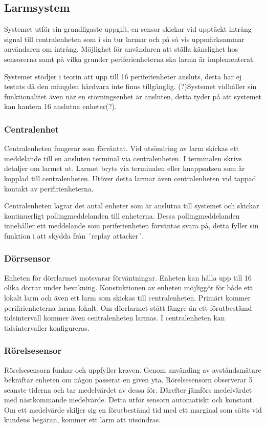 \documentclass[a4paper]{article}
\begin{document}
\subsection{Larmsystem}
Systemet utför sin grundligaste uppgift, en sensor skickar vid upptäckt intrång signal till centralenheten som i sin tur larmar och på så vis uppmärksammar användaren om intrång. Möjlighet för användaren att ställa känslighet hos sensorerna samt på vilka grunder periferienheterna ska larma är implementerat.

Systemet stödjer i teorin att upp till 16 periferienheter ansluts, detta har ej testats då den mängden hårdvara inte finns tillgänglig. (?)Systemet vidhåller sin funktionalitet även när en störningsenhet är ansluten, detta tyder på att systemet kan hantera 16 anslutna enheter(?).

\subsubsection{Centralenhet}
Centralenheten fungerar som förväntat. Vid utsöndring av larm skickas ett meddelande till en ansluten terminal via centralenheten. I terminalen skrivs detaljer om larmet ut. Larmet bryts via terminalen eller knappsatsen som är kopplad till centralenheten. Utöver detta larmar även centralenheten vid tappad kontakt av perifirienheterna.

Centralenheten lagrar det antal enheter som är anslutna till systemet och skickar kontinuerligt pollingmeddelanden till enheterna. Dessa pollingmeddelanden innehåller ett meddelande som periferienheten förväntas svara på, detta fyller sin funktion i att skydda från ´replay attacker´.

\subsubsection{Dörrsensor}
Enheten för dörrlarmet motsvarar förväntningar. Enheten kan hålla upp till 16 olika dörrar under bevakning. Konstuktionen av enheten möjliggör för både ett lokalt larm och även ett larm som skickas till centralenheten. Primärt kommer perifirienheterna larma lokalt. Om dörrlarmet stått längre än ett förutbestämd tidsintervall kommer även centralenheten larmas. I centralenheten kan tidsintervaller konfigureras.

\subsubsection{Rörelsesensor}
Rörelsesensorn funkar och uppfyller kraven. Genom använding av avståndsmätare bekräftar enheten om någon passerat en given yta. Rörelsesensorn observerar 5 seanste tiderna och tar medelvärdet av dessa för. Därefter jämförs medelvärdet med nästkommande medelvärde. Detta utför sensorn automatiskt och konstant. Om ett medelvärde skiljer sig en förutbestämd tid med ett marginal som sätts vid kundens begäran, kommer ett larm att utsöndras.
\end{document}
